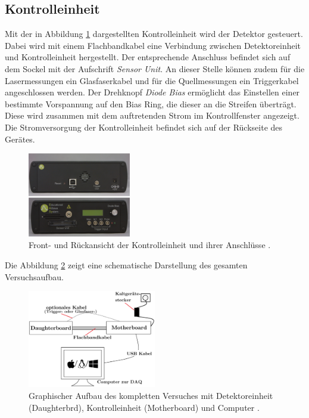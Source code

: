 \subsection{Kontrolleinheit}
Mit der in Abbildung \ref{fig:control} dargestellten Kontrolleinheit wird der Detektor gesteuert. Dabei wird mit einem Flachbandkabel eine Verbindung zwischen Detektoreinheit und Kontrolleinheit
hergestellt. Der entsprechende Anschluss befindet sich auf dem Sockel mit der Aufschrift \textit{Sensor Unit}. An dieser Stelle können zudem für die Lasermessungen ein Glasfaserkabel und für die Quellmessungen ein Triggerkabel angeschlossen werden. Der Drehknopf \textit{Diode Bias} ermöglicht das Einstellen einer bestimmte Vorspannung auf den Bias Ring, die dieser an die Streifen überträgt. Diese wird zusammen mit dem auftretenden Strom im Kontrollfenster angezeigt. Die Stromversorgung der Kontrolleinheit befindet sich auf der Rückseite des Gerätes.
\begin{figure}[htb]
  \centering
  \includegraphics[width=0.4\textwidth]{graphics/Control.png}
  \caption{Front- und Rückansicht der Kontrolleinheit und ihrer Anschlüsse \cite{anleitung}.}
  \label{fig:control}
\end{figure}
Die Abbildung \ref{fig:aufbau} zeigt eine schematische Darstellung des gesamten Versuchsaufbau.
\begin{figure}[htb]
  \centering
  \includegraphics[width=0.5\textwidth]{graphics/Aufbau.png}
  \caption{Graphischer Aufbau des kompletten Versuches mit Detektoreinheit
  (Daughterbrd), Kontrolleinheit (Motherboard) und Computer \cite{anleitung}.}
  \label{fig:aufbau}
\end{figure}
